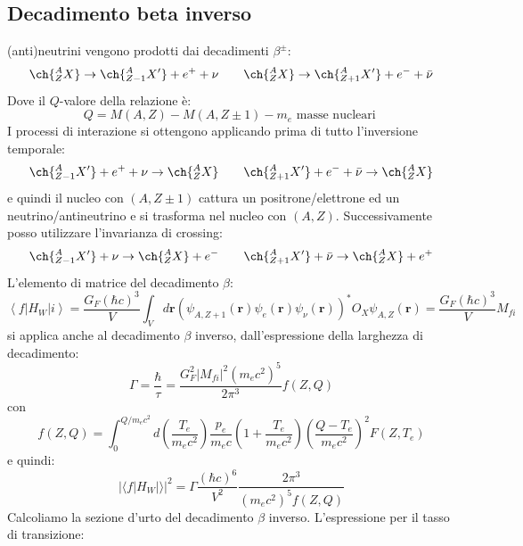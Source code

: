 \subsection{Decadimento beta inverso}
(anti)neutrini vengono prodotti dai decadimenti $\beta^\pm$:
\begin{equation*}
    \ch{^A_ZX}\to \ch{^A_{Z-1}X'}+e^++\nu \qquad   \ch{^A_ZX}\to \ch{^A_{Z+1}X'}+e^-+\Bar{\nu}
\end{equation*}
Dove il $Q$-valore della relazione è:
\begin{equation*}
    Q=M(A,Z)-M(A,Z\pm1)-m_e \text{ masse nucleari }
\end{equation*}
I processi di interazione si ottengono applicando prima di tutto l'inversione temporale:
\begin{equation*}
    \ch{^A_{Z-1}X'}+e^++\nu\to\ch{^A_ZX} \qquad  \ch{^A_{Z+1}X'}+e^-+\Bar{\nu}\to\ch{^A_ZX}
\end{equation*}
e quindi il nucleo con $(A,Z\pm1)$ cattura un positrone/elettrone ed un neutrino/antineutrino e si trasforma nel nucleo con $(A,Z)$. Successivamente posso utilizzare l'invarianza di crossing:
\begin{equation*}
    \ch{^A_{Z-1}X'}+\nu\to\ch{^A_ZX}+e^- \qquad  \ch{^A_{Z+1}X'}+\Bar{\nu}\to\ch{^A_ZX}+e^+
\end{equation*}
L'elemento di matrice del decadimento $\beta$:
\begin{equation*}
      \left\langle f\left|H_W\right| i\right\rangle =\frac{G_F(\hbar c)^3}{V} \int_V d \mathbf{r}\left(\psi_{A, Z+1}(\mathbf{r}) \psi_e(\mathbf{r}) \psi_\nu(\mathbf{r})\right)^* O_X \psi_{A, Z}(\mathbf{r})=\frac{G_F(\hbar c)^3}{V}M_{fi}
\end{equation*}
si applica anche al decadimento $\beta$ inverso, dall'espressione della larghezza di decadimento:
\begin{equation*}
    \Gamma=\frac{\hbar}{\tau}=\frac{G_F^2|M_{fi}|^2(m_ec^2)^5}{2\pi^3}f(Z,Q)
\end{equation*}
con
\begin{equation*}
    f(Z, Q)=\int_0^{Q / m_e c^2} d\left(\frac{T_e}{m_e c^2}\right) \frac{p_e}{m_e c}\left(1+\frac{T_e}{m_e c^2}\right)\left(\frac{Q-T_e}{m_e c^2}\right)^2 F\left(Z, T_e\right)
\end{equation*}
e quindi:
\begin{equation*}
    |\langle f|H_W|\rangle|^2=\Gamma\frac{(\hbar c)^6}{V^2}\frac{2\pi^3}{(m_e c^2)^5f(Z,Q)}
\end{equation*}
Calcoliamo la sezione d'urto del decadimento $\beta$ inverso. L'espressione per il tasso di transizione:
